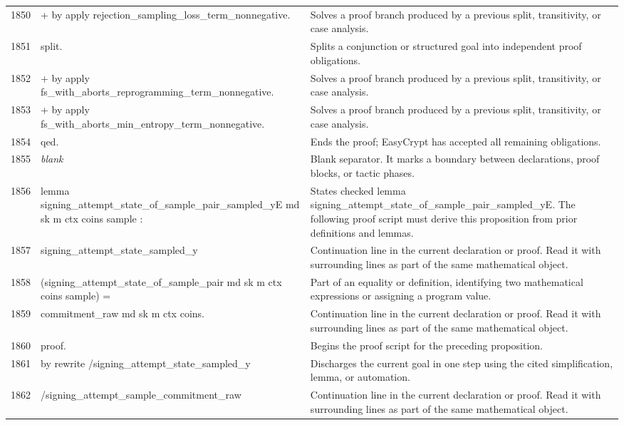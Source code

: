 \documentclass[10pt]{article}
\begin{document}
\begin{longtable}{r L{0.53\textwidth} L{0.37\textwidth}}
1850 & {\ttfamily\scriptsize + by apply rejection\_sampling\_loss\_term\_nonnegative.} & Solves a proof branch produced by a previous split, transitivity, or case analysis. \\
1851 & {\ttfamily\scriptsize split.} & Splits a conjunction or structured goal into independent proof obligations. \\
1852 & {\ttfamily\scriptsize + by apply fs\_with\_aborts\_reprogramming\_term\_nonnegative.} & Solves a proof branch produced by a previous split, transitivity, or case analysis. \\
1853 & {\ttfamily\scriptsize + by apply fs\_with\_aborts\_min\_entropy\_term\_nonnegative.} & Solves a proof branch produced by a previous split, transitivity, or case analysis. \\
1854 & {\ttfamily\scriptsize qed.} & Ends the proof; EasyCrypt has accepted all remaining obligations. \\
1855 & {\ttfamily\scriptsize \emph{blank}} & Blank separator.  It marks a boundary between declarations, proof blocks, or tactic phases. \\
1856 & {\ttfamily\scriptsize lemma signing\_attempt\_state\_of\_sample\_pair\_sampled\_yE md sk m ctx coins sample :} & States checked lemma signing\_attempt\_state\_of\_sample\_pair\_sampled\_yE.  The following proof script must derive this proposition from prior definitions and lemmas. \\
1857 & {\ttfamily\scriptsize   signing\_attempt\_state\_sampled\_y} & Continuation line in the current declaration or proof.  Read it with surrounding lines as part of the same mathematical object. \\
1858 & {\ttfamily\scriptsize     (signing\_attempt\_state\_of\_sample\_pair md sk m ctx coins sample) =} & Part of an equality or definition, identifying two mathematical expressions or assigning a program value. \\
1859 & {\ttfamily\scriptsize   commitment\_raw md sk m ctx coins.} & Continuation line in the current declaration or proof.  Read it with surrounding lines as part of the same mathematical object. \\
1860 & {\ttfamily\scriptsize proof.} & Begins the proof script for the preceding proposition. \\
1861 & {\ttfamily\scriptsize by rewrite /signing\_attempt\_state\_sampled\_y} & Discharges the current goal in one step using the cited simplification, lemma, or automation. \\
1862 & {\ttfamily\scriptsize            /signing\_attempt\_sample\_commitment\_raw} & Continuation line in the current declaration or proof.  Read it with surrounding lines as part of the same mathematical object. \\

\end{longtable}
\end{document}
